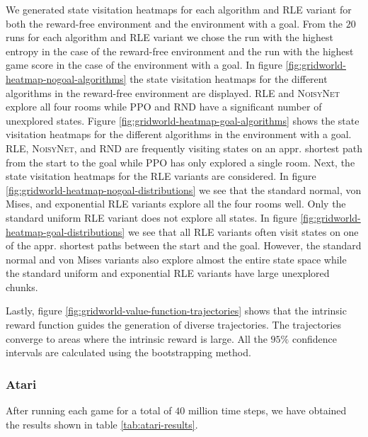 \documentclass[10pt]{article} %
\begin{document}
We generated state visitation heatmaps for each algorithm and \textsc{RLE} variant for both the reward-free environment and the environment with a goal. From the $20$ runs for each algorithm and \textsc{RLE} variant we chose the run with the highest entropy in the case of the reward-free environment and the run with the highest game score in the case of the environment with a goal. In figure \ref{fig:gridworld-heatmap-nogoal-algorithms} the state visitation heatmaps for the different algorithms in the reward-free environment are displayed. \textsc{RLE} and \textsc{NoisyNet} explore all four rooms while \textsc{PPO} and \textsc{RND} have a significant number of unexplored states. Figure \ref{fig:gridworld-heatmap-goal-algorithms} shows the state visitation heatmaps for the different algorithms in the environment with a goal. \textsc{RLE}, \textsc{NoisyNet}, and \textsc{RND} are frequently visiting states on an appr. shortest path from the start to the goal while \textsc{PPO} has only explored a single room. Next, the state visitation heatmaps for the \textsc{RLE} variants are considered. In figure \ref{fig:gridworld-heatmap-nogoal-distributions} we see that the standard normal, von Mises, and exponential \textsc{RLE} variants explore all the four rooms well. Only the standard uniform \textsc{RLE} variant does not explore all states. In figure \ref{fig:gridworld-heatmap-goal-distributions} we see that all \textsc{RLE} variants often visit states on one of the appr. shortest paths between the start and the goal. However, the standard normal and von Mises variants also explore almost the entire state space while the standard uniform and exponential \textsc{RLE} variants have large unexplored chunks.

Lastly, figure \ref{fig:gridworld-value-function-trajectories} shows that the intrinsic reward function guides the generation of diverse trajectories. The trajectories converge to areas where the intrinsic reward is large. All the $95\%$ confidence intervals are calculated using the bootstrapping method. 

\subsubsection{Atari}

After running each game for a total of $40$ million time steps, we have obtained the results shown in table \ref{tab:atari-results}.
\end{document}
